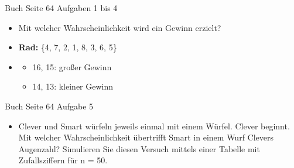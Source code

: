 \documentclass[11pt,a4paper,oneside]{article}
\begin{document}
\begin{aufgabe}{Buch Seite 64 Aufgaben 1 bis 4 }
\begin{enumerate}
\begin{itemize}
				\item Mit welcher Wahrscheinlichkeit wird ein Gewinn erzielt? 
				\item [$\Rightarrow$] \textbf{Rad:} \{4, 7, 2, 1, 8, 3, 6, 5\}
				\item [\textbf{Augensumme:}] 
				\begin{itemize}
					\item 16, 15: großer Gewinn 
					\item 14, 13: kleiner Gewinn
				\end{itemize}
			\end{itemize}
		\end{enumerate}
	\end{aufgabe}
	

	\newpage


	\begin{aufgabe}{Buch Seite 64 Aufgabe 5}
		\begin{itemize}
			\item [5.] Clever und Smart würfeln jeweils einmal mit einem Würfel. Clever beginnt. Mit welcher Wahrscheinlichkeit übertrifft Smart in einem Wurf Clevers Augenzahl? Simulieren Sie diesen Versuch mittels einer Tabelle mit Zufallsziffern für n = 50.
		\end{itemize}
	\end{aufgabe}
	
\end{document}
